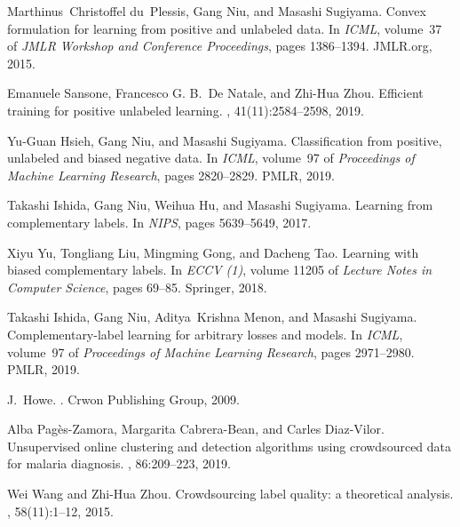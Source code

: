 \documentclass[]{article} \usepackage{geometry}
\begin{document}
\begin{thebibliography}{10}
Marthinus~Christoffel du~Plessis, Gang Niu, and Masashi Sugiyama.
\newblock Convex formulation for learning from positive and unlabeled data.
\newblock In {\em {ICML}}, volume~37 of {\em {JMLR} Workshop and Conference
  Proceedings}, pages 1386--1394. JMLR.org, 2015.

Emanuele Sansone, Francesco G. B.~De Natale, and Zhi{-}Hua Zhou.
\newblock Efficient training for positive unlabeled learning.
, 41(11):2584--2598,
  2019.

Yu{-}Guan Hsieh, Gang Niu, and Masashi Sugiyama.
\newblock Classification from positive, unlabeled and biased negative data.
\newblock In {\em {ICML}}, volume~97 of {\em Proceedings of Machine Learning
  Research}, pages 2820--2829. {PMLR}, 2019.

Takashi Ishida, Gang Niu, Weihua Hu, and Masashi Sugiyama.
\newblock Learning from complementary labels.
\newblock In {\em {NIPS}}, pages 5639--5649, 2017.

Xiyu Yu, Tongliang Liu, Mingming Gong, and Dacheng Tao.
\newblock Learning with biased complementary labels.
\newblock In {\em {ECCV} {(1)}}, volume 11205 of {\em Lecture Notes in Computer
  Science}, pages 69--85. Springer, 2018.

Takashi Ishida, Gang Niu, Aditya~Krishna Menon, and Masashi Sugiyama.
\newblock Complementary-label learning for arbitrary losses and models.
\newblock In {\em {ICML}}, volume~97 of {\em Proceedings of Machine Learning
  Research}, pages 2971--2980. {PMLR}, 2019.

J.~Howe.
.
\newblock Crwon Publishing Group, 2009.

Alba Pag{\`{e}}s{-}Zamora, Margarita Cabrera{-}Bean, and Carles Diaz{-}Vilor.
\newblock Unsupervised online clustering and detection algorithms using
  crowdsourced data for malaria diagnosis.
, 86:209--223, 2019.

Wei Wang and Zhi{-}Hua Zhou.
\newblock Crowdsourcing label quality: a theoretical analysis.
, 58(11):1--12, 2015.


\end{thebibliography}
\end{document}
